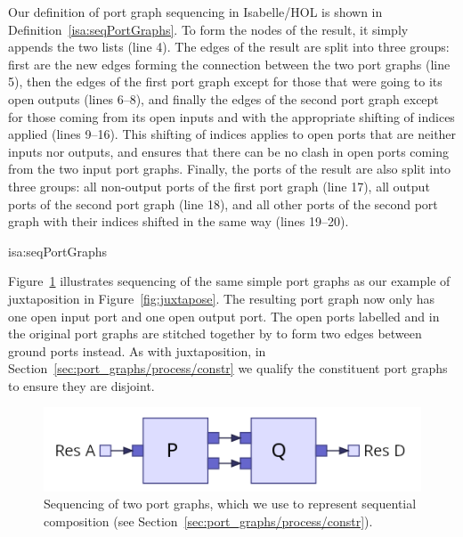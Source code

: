\documentclass[class=smolathesis,crop=false]{standalone}
\begin{document}
Our definition of port graph sequencing in Isabelle/HOL is shown in Definition~\ref{isa:seqPortGraphs}.
\cbstart
To form the nodes of the result, it simply appends the two lists (line 4).
The edges of the result are split into three groups: first are the new edges forming the connection between the two port graphs (line 5), then the edges of the first port graph except for those that were going to its open outputs (lines 6--8), and finally the edges of the second port graph except for those coming from its open inputs and with the appropriate shifting of indices applied (lines 9--16).
This shifting of indices applies to open ports that are neither inputs nor outputs, and ensures that there can be no clash in open ports coming from the two input port graphs.
Finally, the ports of the result are also split into three groups: all non-output ports of the first port graph (line 17), all output ports of the second port graph (line 18), and all other ports of the second port graph with their indices shifted in the same way (lines 19--20).
\cbend

\begin{isadef}{isa:seqPortGraphs}
  \begin{linenumbers*}
    
  \end{linenumbers*}
\end{isadef}

Figure~\ref{fig:seqPortGraphs} illustrates sequencing of the same simple port graphs as our example of juxtaposition in Figure~\ref{fig:juxtapose}.
The resulting port graph now only has one open input port and one open output port.
The open ports labelled  and  in the original port graphs are stitched together by  to form two edges between ground ports instead.
As with juxtaposition, in Section~\ref{sec:port_graphs/process/constr} we qualify the constituent port graphs to ensure they are disjoint.

\begin{figure}[htb]
  \centering
  \includegraphics[scale=0.4]{img/seq_port_graph.png}
  \caption{Sequencing of two port graphs, which we use to represent sequential composition (see Section~\ref{sec:port_graphs/process/constr}).}
  \label{fig:seqPortGraphs}
\end{figure}
\end{document}
